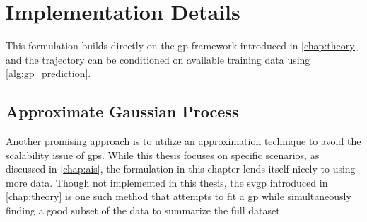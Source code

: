 \section{Implementation Details}

This formulation builds directly on the \acrshort{gp} framework introduced in \cref{chap:theory} and the trajectory can be conditioned on available training data using \cref{alg:gp_prediction}. 

\subsection{Approximate Gaussian Process}
Another promising approach is to utilize an approximation technique to avoid the scalability issue of \acrshort{gp}s. While this thesis focuses on specific scenarios, as discussed in \cref{chap:ais}, the formulation in this chapter lends itself nicely to using more data. Though not implemented in this thesis, the \acrshort{svgp} introduced in \cref{chap:theory} is one such method that attempts to fit a \acrshort{gp} while simultaneously finding a good subset of the data to summarize the full dataset.


